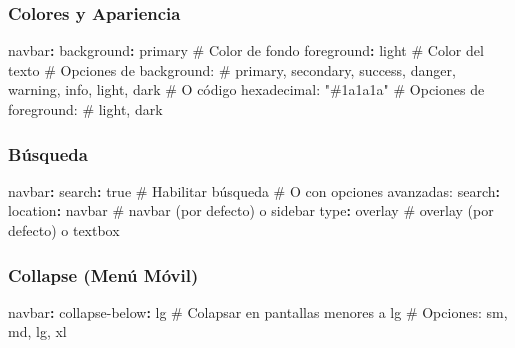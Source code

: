 \documentclass[
  doc,
  floatsintext,
  longtable,
  a4paper,
  nolmodern,
  notxfonts,
  notimes,
  12pt,
  colorlinks=true,linkcolor=blue,citecolor=blue,urlcolor=blue]{apa7}
\newenvironment{Shaded}{\begin{snugshade}}{\end{snugshade}}
\newcommand{\AttributeTok}[1]{\textcolor[rgb]{0.40,0.45,0.13}{#1}}
\newcommand{\CharTok}[1]{\textcolor[rgb]{0.13,0.47,0.30}{#1}}
\newcommand{\CommentTok}[1]{\textcolor[rgb]{0.37,0.37,0.37}{#1}}
\newcommand{\FunctionTok}[1]{\textcolor[rgb]{0.28,0.35,0.67}{#1}}
\newcommand{\KeywordTok}[1]{\textcolor[rgb]{0.00,0.23,0.31}{\textbf{#1}}}
\begin{document}
\subsubsection{Colores y Apariencia}\label{colores-y-apariencia}

\begin{Shaded}
\begin{Highlighting}[]
\FunctionTok{navbar}\KeywordTok{:}
\AttributeTok{  }\FunctionTok{background}\KeywordTok{:}\AttributeTok{ primary}\CommentTok{                \# Color de fondo}
\AttributeTok{  }\FunctionTok{foreground}\KeywordTok{:}\AttributeTok{ light}\CommentTok{                  \# Color del texto}
\AttributeTok{  }
\CommentTok{  \# Opciones de background:}
\CommentTok{  \# primary, secondary, success, danger, warning, info, light, dark}
\CommentTok{  \# O código hexadecimal: "\#1a1a1a"}
\AttributeTok{  }
\CommentTok{  \# Opciones de foreground:}
\CommentTok{  \# light, dark}
\end{Highlighting}
\end{Shaded}

\subsubsection{Búsqueda}\label{buxfasqueda}

\begin{Shaded}
\begin{Highlighting}[]
\FunctionTok{navbar}\KeywordTok{:}
\AttributeTok{  }\FunctionTok{search}\KeywordTok{:}\AttributeTok{ }\CharTok{true}\CommentTok{                       \# Habilitar búsqueda}
\CommentTok{  \# O con opciones avanzadas:}
\AttributeTok{  }\FunctionTok{search}\KeywordTok{:}
\AttributeTok{    }\FunctionTok{location}\KeywordTok{:}\AttributeTok{ navbar}\CommentTok{                 \# navbar (por defecto) o sidebar}
\AttributeTok{    }\FunctionTok{type}\KeywordTok{:}\AttributeTok{ overlay}\CommentTok{                    \# overlay (por defecto) o textbox}
\end{Highlighting}
\end{Shaded}

\subsubsection{Collapse (Menú Móvil)}\label{collapse-menuxfa-muxf3vil}

\begin{Shaded}
\begin{Highlighting}[]
\FunctionTok{navbar}\KeywordTok{:}
\AttributeTok{  }\FunctionTok{collapse{-}below}\KeywordTok{:}\AttributeTok{ lg}\CommentTok{                 \# Colapsar en pantallas menores a lg}
\CommentTok{  \# Opciones: sm, md, lg, xl}
\end{Highlighting}
\end{Shaded}
\end{document}
